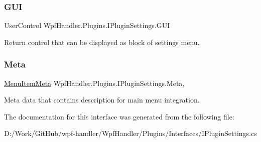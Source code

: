 \subsubsection{\texorpdfstring{G\+UI}{GUI}}
{\footnotesize\ttfamily User\+Control Wpf\+Handler.\+Plugins.\+I\+Plugin\+Settings.\+G\+UI\hspace{0.3cm}{\ttfamily [get]}}



Return control that can be displayed as block of settings menu. 

\mbox{\label{interface_wpf_handler_1_1_plugins_1_1_i_plugin_settings_a63a2624a2e5f76e870817ebb292ec462}} 
\subsubsection{\texorpdfstring{Meta}{Meta}}
{\footnotesize\ttfamily \mbox{\hyperlink{class_wpf_handler_1_1_plugins_1_1_menu_item_meta}{Menu\+Item\+Meta}} Wpf\+Handler.\+Plugins.\+I\+Plugin\+Settings.\+Meta\hspace{0.3cm}{\ttfamily [get]}, {\ttfamily [set]}}



Meta data that contains description for main menu integration. 



The documentation for this interface was generated from the following file\+:\begin{DoxyCompactItemize}
\item 
D\+:/\+Work/\+Git\+Hub/wpf-\/handler/\+Wpf\+Handler/\+Plugins/\+Interfaces/I\+Plugin\+Settings.\+cs\end{DoxyCompactItemize}

